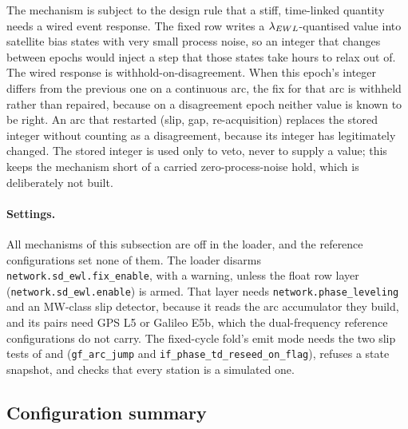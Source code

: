 \documentclass[main.tex]{subfiles}
\begin{document}
The mechanism is subject to the design rule that a stiff, time-linked
quantity needs a wired event response.  The fixed row writes a
$\lambda_{EWL}$-quantised value into satellite bias states with very small
process noise, so an integer that changes between epochs would inject a
step that those states take hours to relax out of.  The wired response
is withhold-on-disagreement.  When this epoch's integer differs from the
previous one on a continuous arc, the fix for that arc is withheld
rather than repaired, because on a disagreement epoch neither value is
known to be right.  An arc that restarted (slip, gap, re-acquisition)
replaces the stored integer without counting as a disagreement, because
its integer has legitimately changed.  The stored integer is used only
to veto, never to supply a value; this keeps the mechanism short of a
carried zero-process-noise hold, which is deliberately not built.

\paragraph{Settings.}
All mechanisms of this subsection are off in the loader, and the reference
configurations set none of them.  The loader disarms
\texttt{network.sd\_ewl.fix\_enable}, with a warning, unless the float row
layer (\texttt{network.sd\_ewl.enable}) is armed.  That layer needs
\texttt{network.phase\_leveling} and an MW-class slip detector, because it reads
the arc accumulator they build, and its pairs need GPS L5 or Galileo E5b,
which the dual-frequency reference configurations do not carry.  The fixed-cycle
fold's emit mode needs the two slip tests of
 and
(\texttt{gf\_arc\_jump} and \texttt{if\_phase\_td\_reseed\_on\_flag}),
refuses a state snapshot, and checks that every station is a simulated one.

\subsection{Configuration summary}\label{sec:ar-config}
\end{document}
